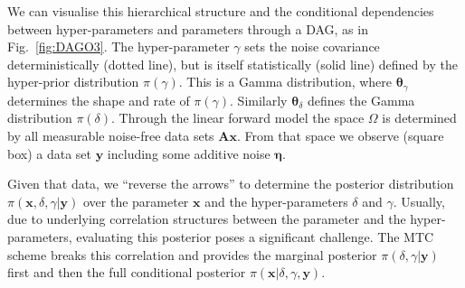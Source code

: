 \documentclass{article}
\begin{document}
We can visualise this hierarchical structure and the conditional dependencies between hyper-parameters and parameters through a DAG, as in Fig.~\ref{fig:DAGO3}.
The hyper-parameter $\gamma$ sets the noise covariance deterministically (dotted line), but is itself statistically (solid line) defined by the hyper-prior distribution $\pi(\gamma)$.
This is a Gamma distribution, where $\bm{\theta}_{\gamma}$ determines the shape and rate of $\pi(\gamma)$.
Similarly $\bm{\theta}_{\delta}$ defines the Gamma distribution $\pi(\delta)$.
Through the linear forward model the space $\Omega$ is determined by all measurable noise-free data sets $\bm{A}\bm{x}$.
From that space we observe (square box) a data set $\bm{y}$ including some additive noise $\bm{\eta}$.

Given that data, we ``reverse the arrows'' to determine the posterior distribution $\pi(\bm{x}, \delta, \gamma |\bm{y})$ over the parameter $\bm{x}$ and the hyper-parameters $\delta$ and $\gamma$.
Usually, due to underlying correlation structures between the parameter and the hyper-parameters, evaluating this posterior poses a significant challenge.
The MTC scheme breaks this correlation and provides the marginal posterior $\pi(\delta, \gamma | \bm{y})$ first and then the full conditional posterior $\pi(\bm{x}|\delta, \gamma,\bm{y})$.
\end{document}
